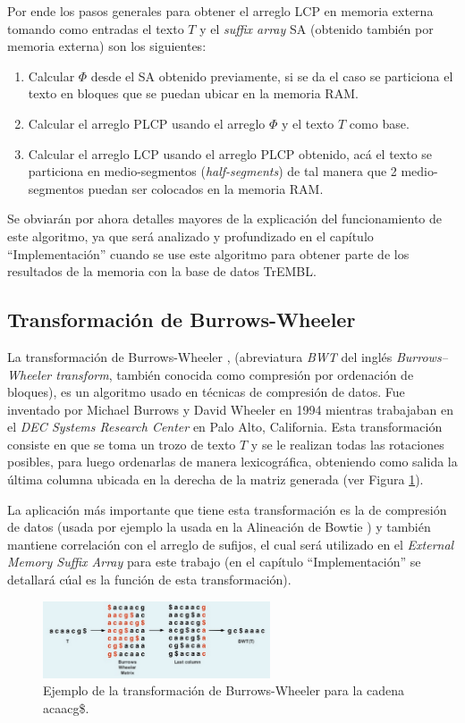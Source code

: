 Por ende los pasos generales para obtener el arreglo LCP en memoria externa tomando como entradas el texto $T$ y el \textit{suffix array} SA (obtenido también por memoria externa) son los siguientes:

\begin{enumerate}

\item Calcular $\Phi$ desde el SA obtenido previamente, si se da el caso se particiona el texto en bloques que se puedan ubicar en la memoria RAM.
\item Calcular el arreglo PLCP usando el arreglo $\Phi$ y el texto $T$ como base.
\item Calcular el arreglo LCP usando el arreglo PLCP obtenido, acá el texto se particiona en medio-segmentos (\textit{half-segments}) de tal manera que 2 medio-segmentos puedan ser colocados en la memoria RAM.

\end{enumerate}

Se obviarán por ahora detalles mayores de la explicación del funcionamiento de este algoritmo, ya que será analizado y profundizado en el capítulo ``Implementación'' cuando se use este algoritmo para obtener parte de los resultados de la memoria con la base de datos TrEMBL.

\subsection{Transformación de Burrows-Wheeler}

La transformación de Burrows-Wheeler \cite{bwt}, (abreviatura \textit{BWT} del inglés \textit{Burrows–Wheeler transform}, también conocida como compresión por ordenación de bloques), es un algoritmo usado en técnicas de compresión de datos. Fue inventado por Michael Burrows y David Wheeler en 1994 mientras trabajaban en el \textit{DEC Systems Research Center} en Palo Alto, California. Esta transformación consiste en que se toma un trozo de texto $T$ y se le realizan todas las rotaciones posibles, para luego ordenarlas de manera lexicográfica, obteniendo como salida la última columna ubicada en la derecha de la matriz generada (ver Figura \ref{fig:comb3}).

La aplicación más importante que tiene esta transformación es la de compresión de datos (usada por ejemplo la usada en la Alineación de Bowtie \cite{bowtie}) y también mantiene correlación con el arreglo de sufijos, el cual será utilizado en el \textit{External Memory Suffix Array} para este trabajo (en el capítulo ``Implementación'' se detallará cúal es la función de esta transformación).

\newpage

\begin{figure}[h]
    \centering
    \includegraphics[width=0.6\textwidth]{./images/bwtejemplo.png}
    \caption{Ejemplo de la transformación de Burrows-Wheeler para la cadena acaacg\$.}
    \label{fig:comb3}
\end{figure}